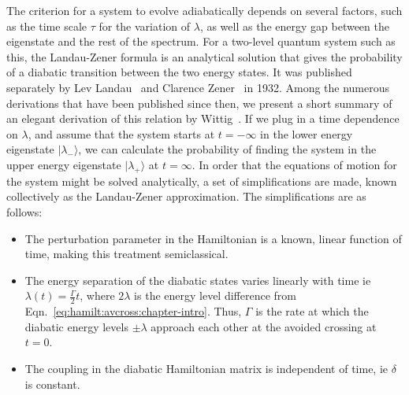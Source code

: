 The criterion for a system to evolve adiabatically depends on several factors, such as the time scale $\tau$ for the variation of $\lambda$, as well as the energy gap between the eigenstate and the rest of the spectrum. For a two-level quantum system such as this, the Landau-Zener formula is an analytical solution that gives the probability of a diabatic transition between the two energy states. It was published separately by Lev Landau~\cite{landau:lzformula} and Clarence Zener~\cite{zener:lzformula} in 1932. Among the numerous derivations that have been published since then, we present a short summary of an elegant derivation of this relation by Wittig~\cite{wittig:lzformula}. If we plug in a time dependence on $\lambda$, and assume that the system starts at $t=-\infty$ in the lower energy eigenstate $|\lambda_-\rangle$, we can calculate the probability of finding the system in the upper energy eigenstate $|\lambda_+\rangle$ at $t=\infty$.  In order that the equations of motion for the system might be solved analytically, a set of simplifications are made, known collectively as the Landau-Zener approximation. The simplifications are as follows:
\begin{itemize}
 \item 
 The perturbation parameter in the Hamiltonian is a known, linear function of time, making this treatment semiclassical.
 \item
 The energy separation of the diabatic states varies linearly with time ie $\lambda(t)=\frac{\Gamma}{2} t$, where $2 \lambda$ is the energy level difference from Eqn.~\ref{eq:hamilt:avcross:chapter-intro}. Thus, $\Gamma$ is the rate at which the diabatic energy levels $\pm \lambda$ approach each other at the avoided crossing at $t=0$.
 \item
 The coupling in the diabatic Hamiltonian matrix is independent of time, ie $\delta$ is constant.
\end{itemize}

